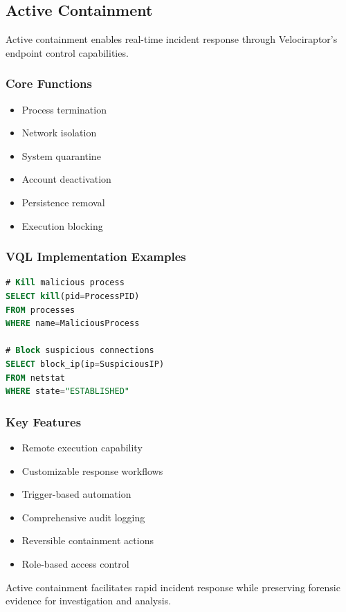 \subsection{Active Containment}
Active containment enables real-time incident response through Velociraptor's endpoint control capabilities.

\subsubsection*{Core Functions}
\begin{itemize}
    \item Process termination
    \item Network isolation
    \item System quarantine
    \item Account deactivation
    \item Persistence removal
    \item Execution blocking
\end{itemize}

\subsubsection*{VQL Implementation Examples}
\begin{lstlisting}[language=SQL]
# Kill malicious process
SELECT kill(pid=ProcessPID) 
FROM processes 
WHERE name=MaliciousProcess

# Block suspicious connections
SELECT block_ip(ip=SuspiciousIP) 
FROM netstat 
WHERE state="ESTABLISHED"
\end{lstlisting}

\subsubsection*{Key Features}
\begin{itemize}
    \item Remote execution capability
    \item Customizable response workflows
    \item Trigger-based automation
    \item Comprehensive audit logging
    \item Reversible containment actions
    \item Role-based access control
\end{itemize}

Active containment facilitates rapid incident response while preserving forensic evidence for investigation and analysis.


